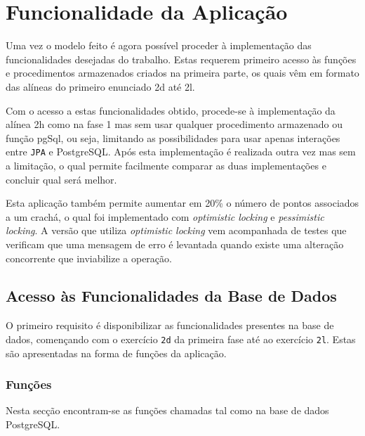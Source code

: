 %
%
\chapter{Funcionalidade da Aplicação} \label{cap3}

Uma vez o modelo feito é agora possível proceder à implementação das funcionalidades desejadas do trabalho. Estas requerem primeiro acesso às funções e procedimentos
armazenados criados na primeira parte, os quais vêm em formato das alíneas do primeiro enunciado 2d até 2l.

Com o acesso a estas funcionalidades obtido, procede-se à implementação da alínea 2h como na fase 1 mas sem usar qualquer procedimento armazenado ou função pgSql,
ou seja, limitando as possibilidades para usar apenas interações entre \texttt{JPA} e PostgreSQL. Após esta implementação é realizada outra vez mas sem a limitação,
o qual permite facilmente comparar as duas implementações e concluir qual será melhor.

Esta aplicação também permite aumentar em 20\% o número de pontos associados a um crachá, o qual foi implementado com \textit{optimistic locking} e \textit{pessimistic
locking}. A versão que utiliza \textit{optimistic locking} vem acompanhada de testes que verificam que uma mensagem de erro é levantada quando existe uma alteração
concorrente que inviabilize a operação.

%
%
\section{Acesso às Funcionalidades da Base de Dados} \label{sec31}

O primeiro requisito é disponibilizar as funcionalidades presentes na base de dados, començando com o exercício \texttt{2d} da primeira fase até ao exercício \texttt{2l}.
Estas são apresentadas na forma de funções da aplicação.

%
%
\subsection{Funções}\label{sec311}

Nesta secção encontram-se as funções chamadas tal como na base de dados PostgreSQL.

